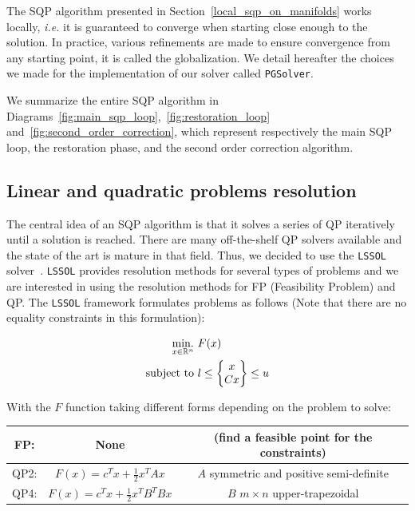 The SQP algorithm presented in Section~\ref{local_sqp_on_manifolds} works locally, \emph{i.e.} it is guaranteed to converge when starting close enough to the solution.
In practice, various refinements are made to ensure convergence from any starting point, it is called the globalization.
We detail hereafter the choices we made for the implementation of our solver called {\tt PGSolver}.

We summarize the entire SQP algorithm in Diagrams~\ref{fig:main_sqp_loop},~\ref{fig:restoration_loop} and~\ref{fig:second_order_correction}, which represent respectively the main SQP loop, the restoration phase, and the second order correction algorithm.

\subsection{Linear and quadratic problems resolution}
\label{sub:linear_and_quadratic_problems_resolution}

The central idea of an SQP algorithm is that it solves a series of QP iteratively until a solution is reached.
There are many off-the-shelf QP solvers available and the state of the art is mature in that field.
Thus, we decided to use the {\tt LSSOL} solver~\cite{gill:techrep:1986}.
{\tt LSSOL} provides resolution methods for several types of problems and we are interested in using the resolution methods for FP (Feasibility Problem) and QP.
The {\tt LSSOL} framework formulates problems as follows (Note that there are no equality constraints in this formulation):

\begin{align}
  \operatorname*{min.}_{x\in \mathbb{R}^n}\ &{F(x)}\\
  \text{subject to}\  & l\leq \begin{Bmatrix}
    x\\
    Cx
  \end{Bmatrix}
  \leq u
\end{align}

With the $F$ function taking different forms depending on the problem to solve:
\begin{table} [H]
\centering
\begin{tabular}{ccc}
  \toprule
  FP:\@ & None & (find a feasible point for the constraints)\\
  \midrule
  QP2: & $F(x)=c^T x+\frac{1}{2} x^T A x$ & $A$ symmetric and positive semi-definite \\
  \midrule
  QP4: & $F(x)=c^T x+\frac{1}{2} x^T B^T B x$ & $B$ $m\times n$ upper-trapezoidal \\
  \bottomrule
\end{tabular}
\end{table}

